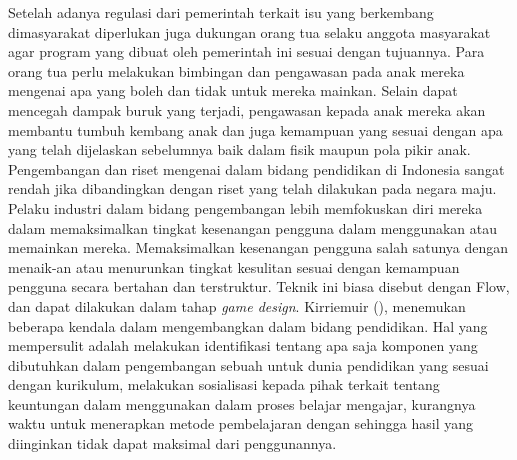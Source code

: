 Setelah adanya regulasi dari pemerintah terkait isu yang berkembang dimasyarakat diperlukan juga dukungan orang tua selaku anggota masyarakat agar program yang dibuat oleh pemerintah ini sesuai dengan tujuannya. Para orang tua perlu melakukan bimbingan dan pengawasan pada anak mereka mengenai \game apa yang boleh dan tidak untuk mereka mainkan. Selain dapat mencegah dampak buruk yang terjadi, pengawasan kepada anak mereka akan membantu tumbuh kembang anak dan juga kemampuan yang sesuai dengan apa yang telah dijelaskan sebelumnya baik dalam fisik maupun pola pikir anak.
\linebreak\linebreak
Pengembangan dan riset mengenai \game dalam bidang pendidikan di Indonesia sangat rendah jika dibandingkan dengan riset yang telah dilakukan pada negara maju. Pelaku industri dalam bidang pengembangan \game lebih memfokuskan diri mereka dalam memaksimalkan tingkat kesenangan pengguna dalam menggunakan atau memainkan \game mereka. Memaksimalkan kesenangan pengguna salah satunya dengan menaik-an atau menurunkan tingkat kesulitan sesuai dengan kemampuan pengguna secara bertahan dan terstruktur. Teknik ini biasa disebut dengan Flow, dan dapat dilakukan dalam tahap \textit{game design}.
\linebreak\linebreak
Kirriemuir (\citeyear{paper.Kirriemuir}), menemukan beberapa kendala dalam mengembangkan \game dalam bidang pendidikan. Hal yang mempersulit adalah melakukan identifikasi tentang apa saja komponen yang dibutuhkan dalam pengembangan sebuah \game untuk dunia pendidikan yang sesuai dengan kurikulum, melakukan sosialisasi kepada pihak terkait tentang keuntungan dalam menggunakan \game dalam proses belajar mengajar, kurangnya waktu untuk menerapkan metode pembelajaran dengan \game sehingga hasil yang diinginkan tidak dapat maksimal dari penggunannya.
\linebreak\linebreak



